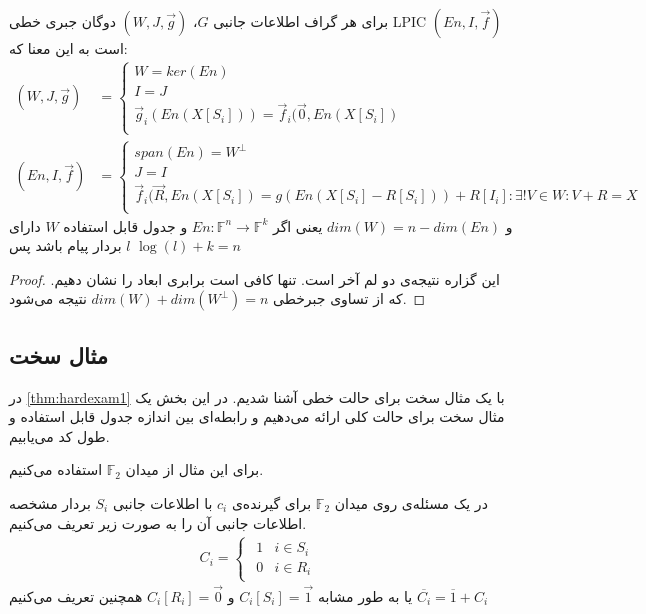 \begin{theorem}
    \label{thm1}
    برای هر گراف اطلاعات جانبی 
    $G$، 
    \lpsicod
     $(W, J, \overrightarrow{g})$
     دوگان جبری خطی
      LPIC $(En, I, \overrightarrow{f})$ 
      است به این معنا که:
    \begin{align*}
    (W, J, \overrightarrow{g}) &= \begin{cases}
                                      W = ker(En)\\
                                      I = J \\
                                      \overrightarrow{g}_i(En(X[S_i])) = \overrightarrow{f}_i(\overrightarrow{0}, En(X[S_i])\\
    \end{cases} \\
    (En, I, \overrightarrow{f}) &= \begin{cases}
                                       span(En) = W^{\bot} \\
                                       J = I \\
                                       \overrightarrow{f}_i(\overrightarrow{R}, En(X[S_i]) = g(En(X[S_i] - R[S_i])) + R[I_i]: \exists! V \in W: V + R = X \\
    \end{cases}
    \end{align*}
    و 
    $dim(W) = n - dim(En)$
     یعنی اگر
     $En: \mathbb{F}^n \rightarrow \mathbb{F}^k$
      و جدول قابل استفاده
      $W$
       دارای 
       $l$
       بردار پیام باشد پس 
       $\log(l) + k = n$
\end{theorem}
\begin{proof}
    این گزاره نتیجه‌ی دو لم آخر است. تنها کافی است برابری ابعاد را نشان دهیم. که از تساوی جبرخطی 
    $dim(W) + dim(W^{\bot}) = n$ 
    نتیجه می‌شود.
\end{proof}
\subsection{
	مثال سخت
}
در 
\autoref{thm:hardexam1}
با یک مثال سخت برای حالت خطی آشنا شدیم. در این بخش یک مثال سخت برای حالت کلی ارائه می‌دهیم و رابطه‌ای بین اندازه جدول قابل استفاده و طول کد می‌یابیم.

برای این مثال از میدان 
$\mathbb{F}_2$
استفاده می‌کنیم.

\begin{definition}
	در یک مسئله‌ی
	\picod
	روی میدان
	$\mathbb{F}_2$
	برای گیرنده‌ی 
	$c_i$
	با اطلاعات جانبی
	$S_i$
	بردار مشخصه اطلاعات جانبی آن را به صورت زیر تعریف می‌کنیم.
	\begin{align}
		C_i =
		\begin{cases}
			\begin{array}{ll}
			1 & i \in S_i \\
			0 &  i \in R_i
		\end{array}
		\end{cases}
	\end{align}
	یا به طور مشابه
	$C_i[S_i] = \vec{1}$
	و
	$ C_i[R_i] = \vec{0}$
	همچنین تعریف می‌کنیم
	$\overline{C_i} = \overline{1} + C_i$
\end{definition}


